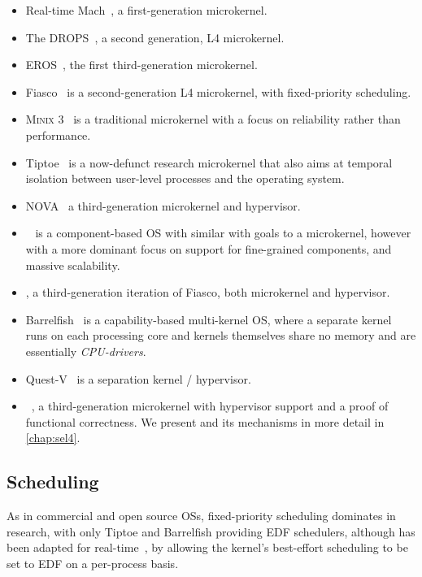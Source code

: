 \begin{itemize}
    \item Real-time Mach~\citep{Mercer_RZ_94, Mercer_ST_93}, a first-generation microkernel.
    \item The \gls{DROPS}~\citep{Haertig_BBHHMRSW_98}, a second
        generation, L4 microkernel.
    \item EROS~\citep{Shapiro_SF_99}, the first third-generation microkernel.
    \item Fiasco~\citep{Hohmuth_02} is a second-generation L4 microkernel, with fixed-priority scheduling.
    \item \textsc{Minix 3}~\citep{Herder_BGHT_06} is a traditional microkernel with a focus on 
        reliability rather than performance. 
    \item Tiptoe~\citep{Craciunas_KPRS_09} is a now-defunct research microkernel that also aims at
temporal isolation between user-level processes and the operating system.
    \item NOVA~\citep{Steinberg_Kauer_10} a third-generation microkernel and hypervisor.
    \item \composite~\citep{Parmer:phd} is a component-based \gls{OS} with similar with goals to a microkernel,
however with a more dominant focus on support for fine-grained components, and massive scalability.
    \item \citet{FiascoOC:URL}, a third-generation iteration of Fiasco, both microkernel and
        hypervisor.
    \item Barrelfish~\citep{Peter_SBBIHR_10} is a capability-based multi-kernel \gls{OS}, where a separate kernel runs on each processing core and kernels themselves share no memory and are essentially \emph{\gls{CPU}-drivers}.
    \item Quest-V~\citep{Danish_LW_11} is a separation kernel / hypervisor.
    \item \selfour~\citep{Klein_AEMSKH_14}, a third-generation microkernel with
        hypervisor support and a proof of functional correctness. We present \selfour 
        and its mechanisms in more detail in \cref{chap:sel4}.
\end{itemize}


\subsection{Scheduling}

As in commercial and open source \glspl{OS}, fixed-priority scheduling dominates in research, with
only Tiptoe and Barrelfish providing \gls{EDF} schedulers, although \minix has been adapted for 
real-time~\citep{Mancina_LFHGT_09}, by allowing the kernel's best-effort scheduling to be
set to \gls{EDF} on a per-process basis.   

